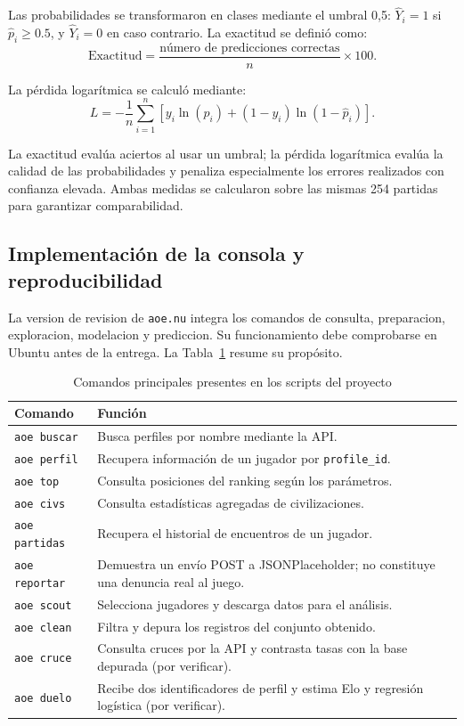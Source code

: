 \documentclass[12pt,a4paper]{article}
\begin{document}
Las probabilidades se transformaron en clases mediante el umbral 0,5: $\hat Y_i=1$ si $\hat p_i\geq0.5$, y $\hat Y_i=0$ en caso contrario. La exactitud se definió como:
\begin{equation}
\mathrm{Exactitud}=\frac{\text{número de predicciones correctas}}{n}\times 100.
\end{equation}

La pérdida logarítmica se calculó mediante:
\begin{equation}
L=-\frac{1}{n}\sum_{i=1}^{n}\left[y_i\ln(\hat p_i)+(1-y_i)\ln(1-\hat p_i)\right].
\end{equation}

La exactitud evalúa aciertos al usar un umbral; la pérdida logarítmica evalúa la calidad de las probabilidades y penaliza especialmente los errores realizados con confianza elevada. Ambas medidas se calcularon sobre las mismas 254 partidas para garantizar comparabilidad.

\subsection{Implementación de la consola y reproducibilidad}

La version de revision de \texttt{aoe.nu} integra los comandos de consulta, preparacion, exploracion, modelacion y prediccion. Su funcionamiento debe comprobarse en Ubuntu antes de la entrega. La Tabla~\ref{tab:comandos} resume su propósito.

\begin{table}[htbp]
\centering\small
\caption{Comandos principales presentes en los scripts del proyecto}
\label{tab:comandos}
\begin{tabularx}{\textwidth}{@{}p{3.2cm}X@{}}
\toprule
\textbf{Comando} & \textbf{Función}\\
\midrule
\texttt{aoe buscar} & Busca perfiles por nombre mediante la API.\\
\texttt{aoe perfil} & Recupera información de un jugador por \texttt{profile\_id}.\\
\texttt{aoe top} & Consulta posiciones del ranking según los parámetros.\\
\texttt{aoe civs} & Consulta estadísticas agregadas de civilizaciones.\\
\texttt{aoe partidas} & Recupera el historial de encuentros de un jugador.\\
\texttt{aoe reportar} & Demuestra un envío POST a JSONPlaceholder; no constituye una denuncia real al juego.\\
\texttt{aoe scout} & Selecciona jugadores y descarga datos para el análisis.\\
\texttt{aoe clean} & Filtra y depura los registros del conjunto obtenido.\\
\texttt{aoe cruce} & Consulta cruces por la API y contrasta tasas con la base depurada (por verificar).\\
\texttt{aoe duelo} & Recibe dos identificadores de perfil y estima Elo y regresión logística (por verificar).\\
\bottomrule
\end{tabularx}
\end{table}
\end{document}
